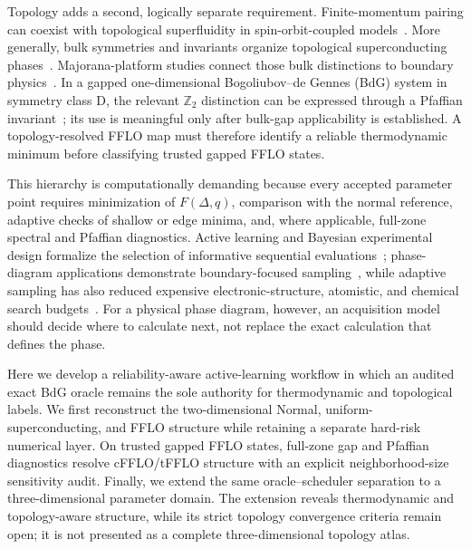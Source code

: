 Topology adds a second, logically separate requirement. Finite-momentum pairing can coexist with topological superfluidity in spin-orbit-coupled models~\cite{ZhangYi2013,QuEtAl2013,CaoEtAl2014}. More generally, bulk symmetries and invariants organize topological superconducting phases~\cite{ReadGreen2000,SatoAndo2017,QiZhang2011,SchnyderEtAl2008,RyuEtAl2010}. Majorana-platform studies connect those bulk distinctions to boundary physics~\cite{LutchynSauDasSarma2010,OregRefaelVonOppen2010,Alicea2012,Beenakker2013}. In a gapped one-dimensional Bogoliubov--de Gennes (BdG) system in symmetry class D, the relevant $\mathbb Z_2$ distinction can be expressed through a Pfaffian invariant~\cite{Kitaev2001,BudichArdonne2013}; its use is meaningful only after bulk-gap applicability is established. A topology-resolved FFLO map must therefore identify a reliable thermodynamic minimum before classifying trusted gapped FFLO states.

This hierarchy is computationally demanding because every accepted parameter point requires minimization of $F(\Delta,q)$, comparison with the normal reference, adaptive checks of shallow or edge minima, and, where applicable, full-zone spectral and Pfaffian diagnostics. Active learning and Bayesian experimental design formalize the selection of informative sequential evaluations~\cite{CohnAtlasLadner1994,MacKay1992,ShahriariEtAl2016}; phase-diagram applications demonstrate boundary-focused sampling~\cite{TerayamaEtAl2019,DaiBrussGlotzer2020,LookmanEtAl2019}, while adaptive sampling has also reduced expensive electronic-structure, atomistic, and chemical search budgets~\cite{TranUlissi2018,PodryabinkinShapeev2017,JinnouchiEtAl2019,VandermauseEtAl2020,BatraEtAl2021,NoeEtAl2019}. For a physical phase diagram, however, an acquisition model should decide where to calculate next, not replace the exact calculation that defines the phase.

Here we develop a reliability-aware active-learning workflow in which an audited exact BdG oracle remains the sole authority for thermodynamic and topological labels. We first reconstruct the two-dimensional Normal, uniform-superconducting, and FFLO structure while retaining a separate hard-risk numerical layer. On trusted gapped FFLO states, full-zone gap and Pfaffian diagnostics resolve cFFLO/tFFLO structure with an explicit neighborhood-size sensitivity audit. Finally, we extend the same oracle--scheduler separation to a three-dimensional parameter domain. The extension reveals thermodynamic and topology-aware structure, while its strict topology convergence criteria remain open; it is not presented as a complete three-dimensional topology atlas.
